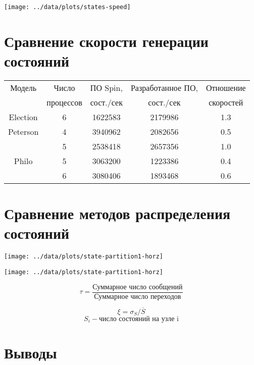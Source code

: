 \documentclass[12pt]{article}
\begin{document}
\begin{center}
  \texttt{[image: ../data/plots/states-speed]}
\end{center}

\section{Сравнение скорости генерации состояний}
\label{sec:stategen-speed}

\begin{tabular}{ccccc}
  \hline
  Модель & Число     & ПО Spin,   & Разработанное ПО, & Отношение \\
  & процессов & сост./сек &  сост./сек         & скоростей \\
  \hline
  Election & 6 & 1622583 & 2179986 & 1.3 \\
  Peterson & 4 & 3940962 & 2082656 & 0.5 \\
   & 5 & 2538418 & 2657356 & 1.0 \\
  Philo & 5 & 3063200 & 1223386 & 0.4 \\
   & 6 & 3080406 & 1893468 & 0.6 \\
  \hline
\end{tabular}

\section{Сравнение методов распределения состояний}
\label{sec:partition-cmp}

\begin{minipage}[m]{0.5\linewidth}
  \texttt{[image: ../data/plots/state-partition1-horz]}  
\end{minipage}
\begin{minipage}[m]{0.5\linewidth}
  \texttt{[image: ../data/plots/state-partition1-horz]}  
\end{minipage}

\small{
  \begin{minipage}[m]{0.5\linewidth}
    $$ \tau = \frac{\text{Суммарное число сообщений}}{\text{Суммарное число переходов}} $$    
  \end{minipage}
  \begin{minipage}[m]{0.5\linewidth}
    $$ \xi = \sigma_S/\overline{S}$$ $$ S_i - \text{число состояний на узле i} $$
  \end{minipage}
}

\section{Выводы}
\label{sec:conclusion}
\end{document}
